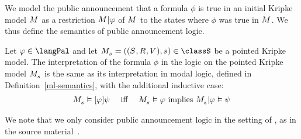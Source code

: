 We model the public announcement that a formula $\phi$ is true in an initial Kripke model $\kModel$ as a restriction $\restrict{\kModel}{\phi}$ of $\kModel$ to the states where $\phi$ was true in $\kModel$.
We thus define the semantics of public announcement logic.

\begin{definition}\label{pal-semantics}
Let $\phi \in \langPal$ and let $\kPModelAndTuple{\kStateS} \in \classS$ be a pointed Kripke model.
The interpretation of the formula $\phi$ in the logic \logicPalS{} on the pointed Kripke model $\kPModel{\kStateS}$ is the same as its interpretation in modal logic, defined in Definition~\ref{ml-semantics}, with the additional inductive case:
$$
\begin{array}{lcl}
\kPModel{\kStateS} \entails \announceA{\phi} \psi & \text{ iff } & \kPModel{\kStateS} \entails \phi \text{ implies } \restrict{\kPModel{\kStateS}}{\phi} \entails \psi
\end{array}
$$
\end{definition}

We note that we only consider public announcement logic in the setting of \classS{}, as in the source material~\cite{plaza:1989}.

